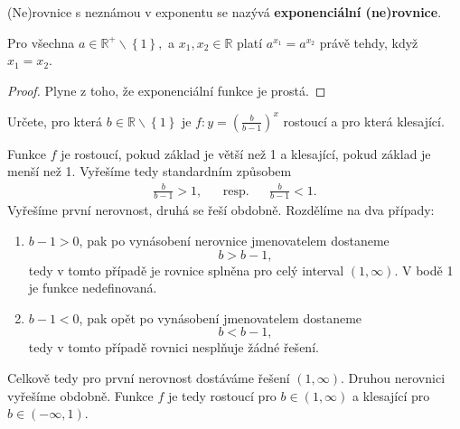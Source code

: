 \begin{definition}
    (Ne)rovnice s neznámou v exponentu se nazývá \textbf{exponenciální (ne)rovnice}.
\end{definition}

\begin{veta}
    Pro všechna $a \in \mathbb R^+ \smallsetminus \left \{ 1 \right \},$ a $x_1, x_2
    \in \mathbb R$ platí $a^{x_1}=a^{x_2}$ právě tehdy, když $x_1=x_2.$
\end{veta}

\begin{proof}
    Plyne z toho, že exponenciální funkce je prostá.
\end{proof}

\begin{priklad}
Určete, pro která $b\in \mathbb R\smallsetminus\left \{ 1 \right \} $ je $f\colon y=\left ( \frac{b}{b-1} \right )^x $
rostoucí a pro která klesající.
\end{priklad}

\begin{reseni}
Funkce $f$ je rostoucí, pokud základ je větší než 1 a klesající, pokud základ je menší než 1.
Vyřešíme tedy standardním způsobem
\begin{align*}
\frac{b}{b-1}>1, & & \textrm{resp.} & & \frac{b}{b-1}<1.
\end{align*}
Vyřešíme první nerovnost, druhá se řeší obdobně.
Rozdělíme na dva případy:
\begin{enumerate}[$i.$]
	\item $b-1 > 0$, pak po vynásobení nerovnice jmenovatelem dostaneme
	$$
	    b > b-1,
	$$
	tedy v tomto případě je rovnice splněna pro celý interval $(1,\infty)$. V bodě 1 je funkce nedefinovaná.
	\item $b-1<0$, pak opět po vynásobení jmenovatelem dostaneme
	$$
	    b < b-1,
	$$
	tedy v tomto případě rovnici nesplňuje žádné řešení.
\end{enumerate}
Celkově tedy pro první nerovnost dostáváme řešení $(1,\infty)$. Druhou nerovnici vyřešíme obdobně. Funkce $f$
je tedy rostoucí pro $b \in (1,\infty)$ a klesající pro $b \in (-\infty, 1)$.
\end{reseni}
